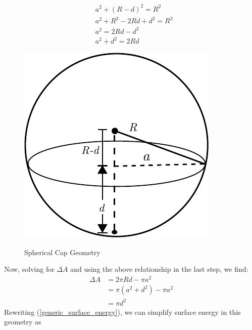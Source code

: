 \begin{figure}[h]
	\begin{minipage}{.5\textwidth}
		\begin{align*}
		&a^2 + (R-d)^2 = R^2 \\
		&a^2 + R^2 - 2Rd +d^2 = R^2 \\
		&a^2 = 2Rd -d^2 \\
		&a^2 + d^2 = 2Rd
		\end{align*}
	\end{minipage}%
	\begin{minipage}{.5\textwidth}
		\centering
		\caption{Spherical Cap Geometry} \vspace{2em}
		\includegraphics[width=.5\linewidth]{Chapters/Figures/SphericalCap}
		\label{fig:sphericalcap}
	\end{minipage}
\end{figure}


\pagebreak
\noindent Now, solving for $ \Delta A $ and using the above relationship in the last step, we find:
\begin{align*}
\Delta A &= 2\pi Rd - \pi a^2 \\
&= \pi(a^2+d^2) - \pi a^2 \\
&= \pi d^2
\end{align*}
 Rewriting (\ref{generic_surface_energy}), we can simplify surface energy in this geometry as 
 
